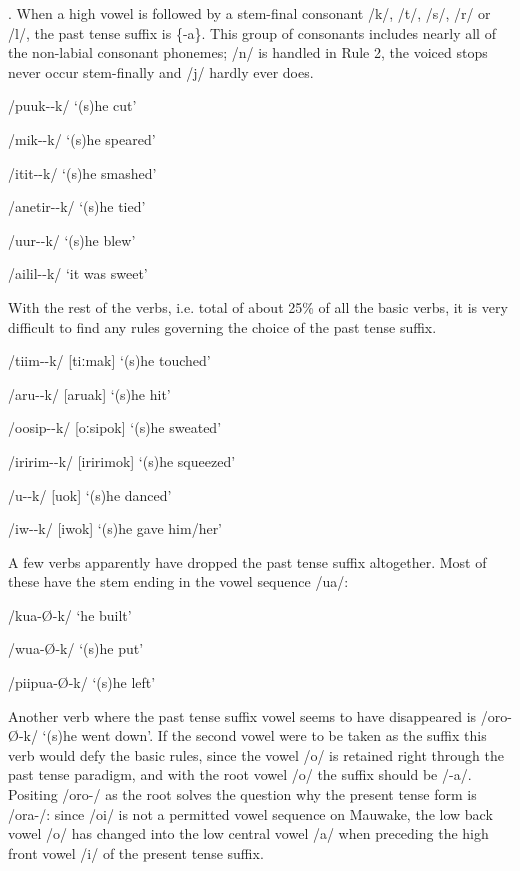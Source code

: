 . When a high vowel is followed by a stem-final consonant /k/, /t/, /s/, /r/ or /l/, the past tense suffix is \{-a\}.  This group of consonants includes nearly all of the non-labial consonant phonemes; /n/ is handled in Rule 2, the voiced stops never occur stem-finally and /j/ hardly ever does.  

/puuk--k/  `(s)he cut'

/mik--k/  `(s)he speared'

/itit--k/  `(s)he smashed'

/anetir--k/  `(s)he tied'

/{\textphi}uur--k/  `(s)he blew'

/a{\textphi}ilil--k/  `it was sweet'

With the rest of the verbs, i.e. total of about 25\% of all the basic verbs, it is very difficult to find any rules governing the choice of the past tense suffix.

/tiim--k/  [{{\textprimstress}tiːmak}]  `(s)he touched'

/aru{\textphi}--k/  [a{{\textprimstress}ru}{\textphi}ak]  `(s)he hit'

/oosip--k/  [{{\textprimstress}oːsipok}]  `(s)he sweated'

/{\textphi}iririm--k/  [{\textphi}i{{\textprimstress}ririmok}]  `(s)he squeezed'

/u{\textphi}--k/  [u{\textphi}{{\textprimstress}ok}]  `(s)he danced'

/iw--k/  [iw{{\textprimstress}ok}]   `(s)he gave him/her'

A few verbs apparently have dropped the past tense suffix altogether.  Most of these have the stem ending in the vowel sequence /ua/:

/kua-{\O-k}/  `he built'

/wua-{\O-k}/  `(s)he put'

/piipua-{\O-k}/  `(s)he left'

Another verb where the past tense suffix vowel seems to have disappeared is /oro-{\O}-k/ `(s)he went down'.  If the second vowel were to be taken as the suffix this verb would defy the basic rules, since the vowel /o/ is retained right through the past tense paradigm, and with the root vowel /o/ the suffix should be /-a/.  Positing /oro-/ as the root solves the question why the present tense form is /ora-/: since /oi/ is not a permitted vowel sequence on Mauwake, the low back vowel /o/ has changed into the low central vowel /a/ when preceding the high front vowel /i/ of the present tense suffix.

